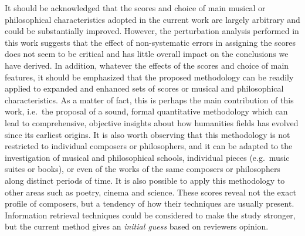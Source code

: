 \documentclass[
 aip,
 jmp,
 amsmath,amssymb,
 reprint,
]{revtex4-1}
\begin{document}
It should be acknowledged that the scores and choice of main
musical or philosophical characteristics adopted in the current work are largely
arbitrary and could be substantially improved.  However, the
perturbation analysis performed in this work suggests that the effect
of non-systematic errors in assigning the scores does not seem to be
critical and has little overall impact on the conclusions we have
derived.  In addition, whatever the effects of the scores and choice
of main features, it should be emphasized that the proposed
methodology can be readily applied to expanded and enhanced sets of
scores or musical and philosophical characteristics.  As a matter of fact, this is
perhaps the main contribution of this work, i.e.\ the proposal of a
sound, formal quantitative methodology which can lead to
comprehensive, objective insights about how humanities fields has evolved
since its earliest origins.  It is also worth observing that this
methodology is not restricted to individual composers or philosophers, and it can
be adapted to the investigation of musical and philosophical schools, individual
pieces (e.g.\ music suites or books), or even of the works of the same composers or philosophers
along distinct periods of time.  It is also possible to apply this
methodology to other areas such as poetry, cinema and science.
These scores reveal not the
exact profile of composers, but a tendency of how their
techniques are usually present. Information retrieval techniques could be considered to make the study stronger, but the current method gives an \emph{initial guess} based on reviewers opinion. 
\end{document}
